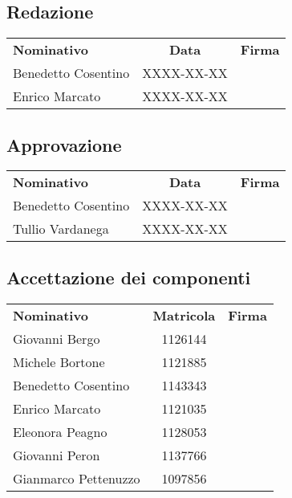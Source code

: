 \subsection{Redazione}
\begin{center}
\begin{tabular}{| l | c | p{8cm} |}
	\rowcolor{LightBlue}
	\color{white}\bfseries Nominativo & 
	\color{white}\bfseries Data & 
	\color{white}\bfseries Firma \\[0.25cm]
	
	Benedetto Cosentino & XXXX-XX-XX & \\
	Enrico Marcato & XXXX-XX-XX & \\ \hline
\end{tabular}
\end{center}

\subsection{Approvazione}

\begin{center}
\begin{tabular}{| l | c | p{8cm} |}
	\rowcolor{LightBlue}
	\color{white}\bfseries Nominativo & 
	\color{white}\bfseries Data & 
	\color{white}\bfseries Firma \\[0.25cm]
	
	Benedetto Cosentino & XXXX-XX-XX & \\
	Tullio Vardanega & XXXX-XX-XX & \\ \hline
\end{tabular}
\end{center}

\subsection{Accettazione dei componenti}
\begin{center}
\begin{tabular}{| l | c | p{8cm} |}
	\rowcolor{LightBlue}
	\color{white}\bfseries Nominativo & 
	\color{white}\bfseries Matricola & 
	\color{white}\bfseries Firma \\[0.25cm]
	
	Giovanni Bergo & 1126144 & \\
	Michele Bortone & 1121885 & \\
	Benedetto Cosentino & 1143343 & \\	
	Enrico Marcato & 1121035 & \\
	Eleonora Peagno & 1128053 & \\
	Giovanni Peron & 1137766 & \\
	Gianmarco Pettenuzzo & 1097856 & \\ \hline
\end{tabular}
\end{center}